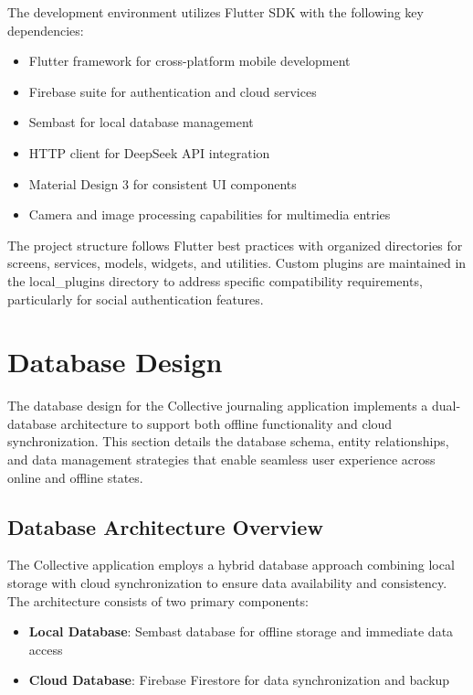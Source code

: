 The development environment utilizes Flutter SDK with the following key dependencies:
\begin{itemize}
    \item Flutter framework for cross-platform mobile development
    \item Firebase suite for authentication and cloud services
    \item Sembast for local database management
    \item HTTP client for DeepSeek API integration
    \item Material Design 3 for consistent UI components
    \item Camera and image processing capabilities for multimedia entries
\end{itemize}

The project structure follows Flutter best practices with organized directories for screens, services, models, widgets, and utilities. Custom plugins are maintained in the local\_plugins directory to address specific compatibility requirements, particularly for social authentication features.

\section{Database Design}\label{sec:database-design}

The database design for the Collective journaling application implements a dual-database architecture to support both offline functionality and cloud synchronization. This section details the database schema, entity relationships, and data management strategies that enable seamless user experience across online and offline states.

\subsection{Database Architecture Overview}\label{subsec:db-architecture}

The Collective application employs a hybrid database approach combining local storage with cloud synchronization to ensure data availability and consistency. The architecture consists of two primary components:

\begin{itemize}
    \item \textbf{Local Database}: Sembast database for offline storage and immediate data access
    \item \textbf{Cloud Database}: Firebase Firestore for data synchronization and backup
\end{itemize}

